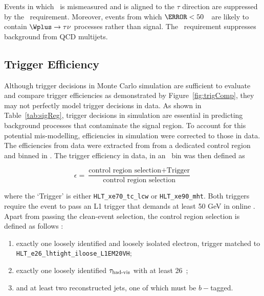 Events in which \met\ is mismeasured and is aligned to the $\tau$ direction are suppressed by the \mT\ 
requirement. Moreover, events from which $\mT<50$~\GeV\ are likely to contain $\Wplus\to\tau\nu$ processes rather 
than signal. The \met\ requirement suppresses background from QCD multijets. 


\subsection{Trigger Efficiency}
\par Although trigger decisions in Monte Carlo simulation are sufficient to evaluate and compare trigger 
efficiencies as demonstrated by Figure~\ref{fig:trigComp}, they may not perfectly model trigger decisions 
in data. As shown in Table~\ref{tab:sigReg}, trigger decisions in simulation are essential in predicting background 
processes that contaminate the signal region. To account for this potential mis-modelling, 
efficiencies in simulation were corrected to those in data. The efficiencies from data 
were extracted from from a dedicated control region and binned in \met. The trigger 
efficiency in data, in an \met\ bin was then defined as 

\begin{equation}
\epsilon = \frac{\text{control region selection} + \text{Trigger}}{\text{control region selection}}
\end{equation}  

where the `Trigger' is either \texttt{HLT\_xe70\_tc\_lcw} or \texttt{HLT\_xe90\_mht}. Both triggers require the 
event to pass an L1 trigger that demands at least 50 GeV in online \met. Apart from passing 
the clean-event selection, the control region selection is defined as follows :
\begin{enumerate}
\item exactly one loosely identified and loosely isolated electron, trigger matched to \\ \texttt{HLT\_e26\_lhtight\_iloose\_L1EM20VH};
\item exactly one loosely identified $\tau_{\text{had-vis}}$ with at least 26~\GeV;
\item and at least two reconstructed jets, one of which must be $b-$tagged.
\end{enumerate} 

